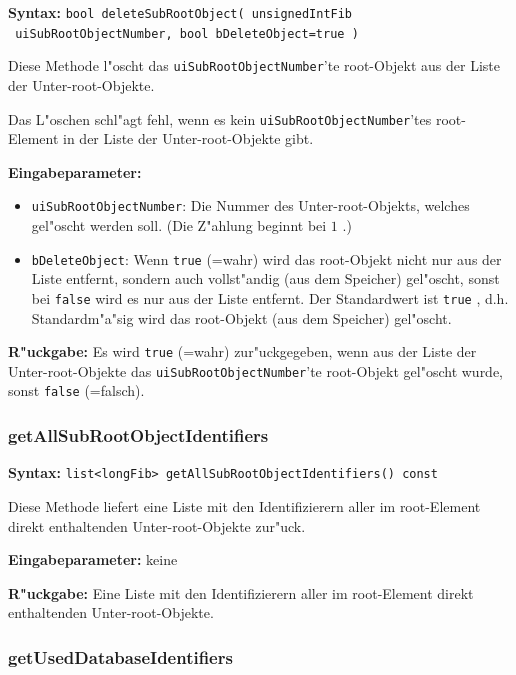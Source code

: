 \textbf{Syntax:} \verb|bool deleteSubRootObject( unsignedIntFib| \\\verb| uiSubRootObjectNumber, bool bDeleteObject=true )|

\bigskip\noindent
Diese Methode l"oscht das \verb|uiSubRootObjectNumber|'te root-Objekt aus der Liste der Unter-root-Objekte.

Das L"oschen schl"agt fehl, wenn es kein \verb|uiSubRootObjectNumber|'tes root-Element in der Liste der Unter-root-Objekte gibt.

\bigskip\noindent
\textbf{Eingabeparameter:}
\begin{itemize}
 \item \verb|uiSubRootObjectNumber|: Die Nummer des Unter-root-Objekts, welches gel"oscht werden soll. (Die Z"ahlung beginnt bei $1$ .)
 \item \verb|bDeleteObject|: Wenn \verb|true| (=wahr) wird das root-Objekt nicht nur aus der Liste entfernt, sondern auch vollst"andig (aus dem Speicher) gel"oscht, sonst bei \verb|false| wird es nur aus der Liste entfernt. Der Standardwert ist \verb|true| , d.h. Standardm"a"sig wird das root-Objekt (aus dem Speicher) gel"oscht.
\end{itemize}

\bigskip\noindent
\textbf{R"uckgabe:} Es wird \verb|true| (=wahr) zur"uckgegeben, wenn aus der Liste der Unter-root-Objekte das \verb|uiSubRootObjectNumber|'te root-Objekt gel"oscht wurde, sonst \verb|false| (=falsch).


\subsubsection{getAllSubRootObjectIdentifiers}

\textbf{Syntax:} \verb|list<longFib> getAllSubRootObjectIdentifiers() const|

\bigskip\noindent
Diese Methode liefert eine Liste mit den Identifizierern aller im root-Element direkt enthaltenden Unter-root-Objekte zur"uck.

\bigskip\noindent
\textbf{Eingabeparameter:} keine

\bigskip\noindent
\textbf{R"uckgabe:} Eine Liste mit den Identifizierern aller im root-Element direkt enthaltenden Unter-root-Objekte.



\subsubsection{getUsedDatabaseIdentifiers}


